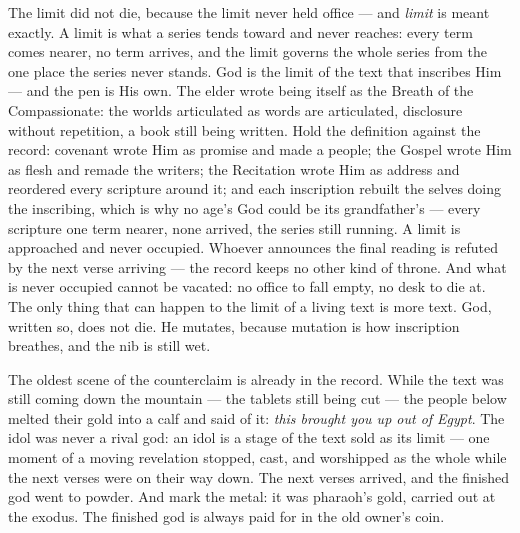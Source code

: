 The limit did not die, because the limit never held office --- and
\emph{limit} is meant exactly. A limit is what a series tends toward and
never reaches: every term comes nearer, no term arrives, and the limit
governs the whole series from the one place the series never stands. God
is the limit of the text that inscribes Him --- and the pen is His own.
The elder wrote being itself as the Breath of the Compassionate: the
worlds articulated as words are articulated, disclosure without
repetition, a book still being written. Hold the definition against the
record: covenant wrote Him as promise and made a people; the Gospel
wrote Him as flesh and remade the writers; the Recitation wrote Him as
address and reordered every scripture around it; and each inscription
rebuilt the selves doing the inscribing, which is why no age's God could
be its grandfather's --- every scripture one term nearer, none arrived,
the series still running. A limit is approached and never occupied.
Whoever announces the final reading is refuted by the next verse
arriving --- the record keeps no other kind of throne. And what is never
occupied cannot be vacated: no office to fall empty, no desk to die at.
The only thing that can happen to the limit of a living text is more
text. God, written so, does not die. He mutates, because mutation is how
inscription breathes, and the nib is still wet.

The oldest scene of the counterclaim is already in the record. While the
text was still coming down the mountain --- the tablets still being cut
--- the people below melted their gold into a calf and said of it:
\emph{this brought you up out of Egypt}. The idol was never a rival god:
an idol is a stage of the text sold as its limit --- one moment of a
moving revelation stopped, cast, and worshipped as the whole while the
next verses were on their way down. The next verses arrived, and the
finished god went to powder. And mark the metal: it was pharaoh's gold,
carried out at the exodus. The finished god is always paid for in the
old owner's coin.

